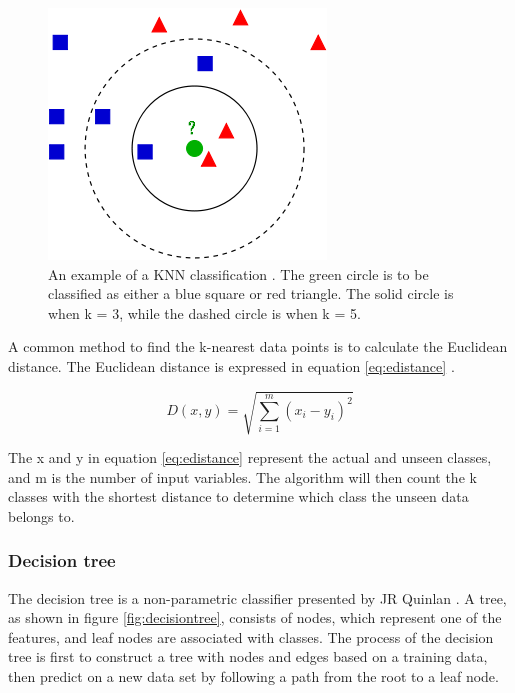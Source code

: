 \documentclass[USenglish]{ifimaster}  %
\begin{document}
\begin{figure}[h]
		\centering
		\includegraphics[scale=0.5]{Figures/KNN.png}
		\caption[An example of KNN classification]{An example of a KNN classification \cite{KnnClassification}. The green circle is to be classified as either a blue square or red triangle. The solid circle is when k = 3, while the dashed circle is when k = 5.}
		\label{fig:KNN}
\end{figure}


A common method to find the k-nearest data points is to calculate the Euclidean distance. The Euclidean distance is expressed in equation \ref{eq:edistance}  \cite{Bao2004}.
	
\begin{equation}
	D(x,y)=\sqrt{\sum_{i=1}^{m}(x_{i}-y_{i})^2}
	\label{eq:edistance}
\end{equation}

The x and y in equation \ref{eq:edistance} represent the actual and unseen classes, and m is the number of input variables. The algorithm will then count the k classes with the shortest distance to determine which class the unseen data belongs to.
	
	
\subsubsection{Decision tree}
The decision tree is a non-parametric classifier presented by JR Quinlan \cite{Quinlan1986}. A tree, as shown in figure \ref{fig:decisiontree}, consists of nodes, which represent one of the features, and leaf nodes are associated with classes. The process of the decision tree is first to construct a tree with nodes and edges based on a training data, then predict on a new data set by following a path from the root to a leaf node. 
\end{document}
